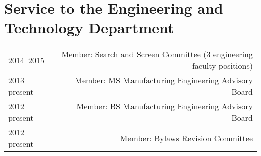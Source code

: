 \section*{Service to the Engineering and Technology Department}
\begin{tabular}{L!{\VRule}R}
2014--2015&Member: Search and Screen Committee (3 engineering faculty positions)\\
2013--present&Member: MS Manufacturing Engineering Advisory Board\\
2012--present&Member: BS Manufacturing Engineering Advisory Board\\
2012--present&Member: Bylaws Revision Committee
\end{tabular}